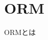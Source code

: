 \documentclass[../../../main]{subfiles}
\begin{document}
    \section{ORM}\label{sec:phraseology-orm}

    ORMとは
\end{document}
